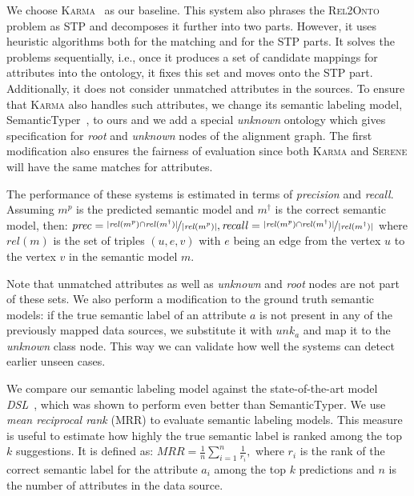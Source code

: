 \documentclass[letterpaper]{article} %
\newcommand{\authornote}[3]{
  {\fbox{\sc 
  #1}:$\blacktriangleright$\textcolor{#2}{\small{#3}}$\blacktriangleleft$}%
}
\newcommand{\npr}[1]{\authornote{NPR}{orange}{#1}}
\newcommand{\relonto}{\textsc{Rel2Onto}}
\newcommand{\karma}{\textsc{Karma}}
\newcommand{\serene}{\textsc{Serene}}
\newcommand{\ignore}[1]{}
\newcommand{\forijcai}[1]{}
\begin{document}
We choose \karma{}~\cite{taheriyan2016learning} as our baseline.
This system also phrases the \relonto{} problem as STP and decomposes it further into two parts.
However, it uses heuristic algorithms both for the matching and for the STP 
parts.
It solves the problems sequentially, i.e., once it produces a set of candidate 
mappings for attributes into the ontology, it fixes this set and moves
onto the STP part.
Additionally, it does not consider unmatched attributes in the sources.
To ensure that \karma{} also handles such attributes, we change its semantic 
labeling model, SemanticTyper~\cite{Ramnandan:Assigning}, to ours and we add a 
special \emph{unknown} ontology which gives specification for \emph{root} and 
\emph{unknown} nodes of the alignment graph.
The first modification also ensures the fairness of evaluation since both 
\karma{} and \serene{} will have the same matches for attributes.

The performance of these systems is estimated in terms of \emph{precision} and \emph{recall}.
Assuming $m^{p}$ is the predicted semantic model and $m^\dag$ is the correct semantic model, then:
$\mathit{prec} = \nicefrac{|\mathit{rel}(m^{p})\cap 
\mathit{rel}(m^\dag)|}{|\mathit{rel}(m^{p})|}, 
\mathit{recall} = \nicefrac{|\mathit{rel}(m^{p})\cap 
\mathit{rel}(m^\dag)|}{|\mathit{rel}(m^\dag)|}$
where $rel(m)$ is the set of triples $(u,e,v)$ with $e$ being an edge from the vertex $u$ to the vertex $v$ in the semantic model $m$.
\ignore{Since we want to estimate the accuracy of both the matching and STP 
parts,
we also include triples for attributes and data nodes into the corresponding 
sets.}
Note that unmatched attributes as well as \emph{unknown} and \emph{root} nodes are not part of these sets.
We also perform a modification to the ground truth semantic models:
if the true semantic label of an attribute $a$ is not present in any of the 
previously mapped data sources, we substitute it with $unk_a$ and map it to the 
\emph{unknown} class node.
This way we can validate how well the systems can detect earlier unseen cases.

\forijcai{To illustrate that our semantic labeling model is better suited for the
matching task, }
We compare our semantic labeling model against the state-of-the-art model \emph{DSL}~\cite{Pham:semantic}, which was shown to perform 
even better than SemanticTyper.
We use \emph{mean reciprocal rank} (MRR) to evaluate semantic labeling models.
This measure is useful to estimate how highly the true semantic label is ranked among the top $k$ suggestions.
It is defined as:
$MRR = \frac{1}{n}\sum_{i=1}^{n}{\frac{1}{r_i}},$
where $r_i$ is the rank of the correct semantic label for the attribute $a_i$ among the top $k$ predictions and $n$ is the number of attributes in the data source.
\end{document}
